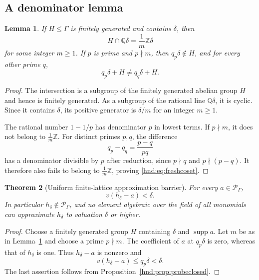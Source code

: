 \documentclass[11pt,oneside]{article}
\newtheorem{theorem}{Theorem}[section]
\newtheorem{lemma}[theorem]{Lemma}
\theoremstyle{definition}
\theoremstyle{remark}
\newcommand{\Q}{\mathbb Q}
\newcommand{\Z}{\mathbb Z}
\newcommand{\Pfield}{\mathscr P_\Gamma}
\newcommand{\supp}{\operatorname{supp}}
\begin{document}
\subsection{A denominator lemma}

\begin{lemma}\label{hnd:lem:cyclicintersection}
If $H\le\Gamma$ is finitely generated and contains $\delta$, then
\begin{equation}\label{hnd:eq:cyclicintersection}
 H\cap\Q\delta=\frac1m\Z\delta
\end{equation}
for some integer $m\ge1$.
If $p$ is prime and $p\nmid m$, then $q_p\delta\notin H$, and for every
other prime $q$,
\begin{equation}\label{hnd:eq:freshcoset}
 q_p\delta+H\ne q_q\delta+H.
\end{equation}
\end{lemma}
\begin{proof}
The intersection is a subgroup of the finitely generated abelian group
$H$ and hence is finitely generated. As a subgroup of the rational line
$\Q\delta$, it is cyclic. Since it contains $\delta$, its positive
generator is $\delta/m$ for an integer $m\ge1$.

The rational number $1-1/p$ has denominator $p$ in lowest terms.
If $p\nmid m$, it does not belong to $\frac1m\Z$. For distinct primes
$p,q$, the difference
\[
 q_p-q_q=\frac{p-q}{pq}
\]
has a denominator divisible by $p$ after reduction, since $p\nmid q$
and $p\nmid(p-q)$. It therefore also fails to belong to
$\frac1m\Z$, proving \eqref{hnd:eq:freshcoset}.
\end{proof}

\begin{theorem}[Uniform finite-lattice approximation barrier]
\label{hnd:thm:barrier}
For every $a\in\Pfield$,
\begin{equation}\label{hnd:eq:barrier}
 v(h_\delta-a)<\delta.
\end{equation}
In particular $h_\delta\notin\Pfield$, and no element algebraic over
the field of all monomials can approximate $h_\delta$ to valuation
$\delta$ or higher.
\end{theorem}
\begin{proof}
Choose a finitely generated group $H$ containing $\delta$ and
$\supp a$. Let $m$ be as in Lemma~\ref{hnd:lem:cyclicintersection} and choose
a prime $p\nmid m$. The coefficient of $a$ at $q_p\delta$ is zero,
whereas that of $h_\delta$ is one. Thus $h_\delta-a$ is nonzero and
\[
 v(h_\delta-a)\le q_p\delta<\delta.
\]
The last assertion follows from Proposition~\ref{hnd:prop:probeclosed}.
\end{proof}
\end{document}
